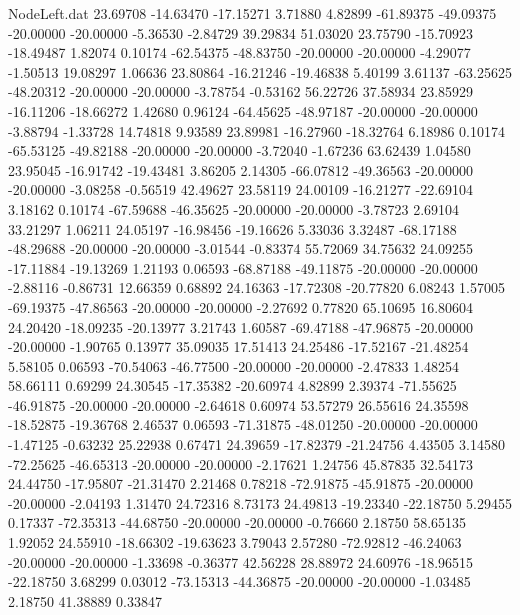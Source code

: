\begin{filecontents}{NodeLeft.dat}
  23.69708  -14.63470  -17.15271     3.71880    4.82899  -61.89375  -49.09375  -20.00000  -20.00000   -5.36530   -2.84729   39.29834   51.03020
  23.75790  -15.70923  -18.49487     1.82074    0.10174  -62.54375  -48.83750  -20.00000  -20.00000   -4.29077   -1.50513   19.08297    1.06636
  23.80864  -16.21246  -19.46838     5.40199    3.61137  -63.25625  -48.20312  -20.00000  -20.00000   -3.78754   -0.53162   56.22726   37.58934
  23.85929  -16.11206  -18.66272     1.42680    0.96124  -64.45625  -48.97187  -20.00000  -20.00000   -3.88794   -1.33728   14.74818    9.93589
  23.89981  -16.27960  -18.32764     6.18986    0.10174  -65.53125  -49.82188  -20.00000  -20.00000   -3.72040   -1.67236   63.62439    1.04580
  23.95045  -16.91742  -19.43481     3.86205    2.14305  -66.07812  -49.36563  -20.00000  -20.00000   -3.08258   -0.56519   42.49627   23.58119
  24.00109  -16.21277  -22.69104     3.18162    0.10174  -67.59688  -46.35625  -20.00000  -20.00000   -3.78723    2.69104   33.21297    1.06211
  24.05197  -16.98456  -19.16626     5.33036    3.32487  -68.17188  -48.29688  -20.00000  -20.00000   -3.01544   -0.83374   55.72069   34.75632
  24.09255  -17.11884  -19.13269     1.21193    0.06593  -68.87188  -49.11875  -20.00000  -20.00000   -2.88116   -0.86731   12.66359    0.68892
  24.16363  -17.72308  -20.77820     6.08243    1.57005  -69.19375  -47.86563  -20.00000  -20.00000   -2.27692    0.77820   65.10695   16.80604
  24.20420  -18.09235  -20.13977     3.21743    1.60587  -69.47188  -47.96875  -20.00000  -20.00000   -1.90765    0.13977   35.09035   17.51413
  24.25486  -17.52167  -21.48254     5.58105    0.06593  -70.54063  -46.77500  -20.00000  -20.00000   -2.47833    1.48254   58.66111    0.69299
  24.30545  -17.35382  -20.60974     4.82899    2.39374  -71.55625  -46.91875  -20.00000  -20.00000   -2.64618    0.60974   53.57279   26.55616
  24.35598  -18.52875  -19.36768     2.46537    0.06593  -71.31875  -48.01250  -20.00000  -20.00000   -1.47125   -0.63232   25.22938    0.67471
  24.39659  -17.82379  -21.24756     4.43505    3.14580  -72.25625  -46.65313  -20.00000  -20.00000   -2.17621    1.24756   45.87835   32.54173
  24.44750  -17.95807  -21.31470     2.21468    0.78218  -72.91875  -45.91875  -20.00000  -20.00000   -2.04193    1.31470   24.72316    8.73173
  24.49813  -19.23340  -22.18750     5.29455    0.17337  -72.35313  -44.68750  -20.00000  -20.00000   -0.76660    2.18750   58.65135    1.92052
  24.55910  -18.66302  -19.63623     3.79043    2.57280  -72.92812  -46.24063  -20.00000  -20.00000   -1.33698   -0.36377   42.56228   28.88972
  24.60976  -18.96515  -22.18750     3.68299    0.03012  -73.15313  -44.36875  -20.00000  -20.00000   -1.03485    2.18750   41.38889    0.33847

\end{filecontents}
